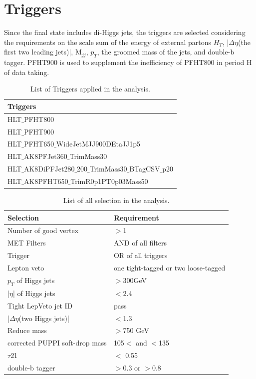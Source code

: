 \section{Triggers} \label{Triggers}
Since the final state includes di-Higgs jets, the triggers are selected considering the requirements on the scale sum of the energy of external partons $H_T$, |$\Delta \eta $(the first two leading jets)|, M$_{jj}$, $p_T$, the groomed mass of the jets, and double-b tagger. PFHT900 is used to supplement the inefficiency of PFHT800 in period H of data taking.
\begin{table}[h!]
  \begin{center}
    \begin{tabular}{l}
    Triggers \\
    \hline
    HLT$\_$PFHT800 \\
    HLT$\_$PFHT900 \\
    HLT$\_$PFHT650$\_$WideJetMJJ900DEtaJJ1p5 \\
    HLT$\_$AK8PFJet360$\_$TrimMass30 \\
    HLT$\_$AK8DiPFJet280$\_$200$\_$TrimMass30$\_$BTagCSV$\_$p20 \\
    HLT$\_$AK8PFHT650$\_$TrimR0p1PT0p03Mass50 \\
    \hline
    \end{tabular}
  \end{center}

  \caption{List of Triggers applied in the analysis.}
\end{table} 

\begin{table}[h!]
  \begin{center}
    \begin{tabular}{ll}
    Selection & Requirement \\
    \hline
    Number of good vertex & $>$1 \\
    MET Filters & AND of all filters\\
	Trigger & OR of all triggers\\
	Lepton veto & one tight-tagged or two loose-tagged \\
    $p_{T}$ of Higgs jets & $>$300GeV \\
	|$\eta$| of Higgs jets & $<$2.4 \\
	Tight LepVeto jet ID & pass \\
	|$\Delta \eta $(two Higgs jets)| & $<$1.3 \\
	Reduce mass & $>$750 GeV \\
	corrected PUPPI soft-drop mass & 105$<$ and $<$135 \\
	$\tau$21 & $<$ 0.55 \\
	double-b tagger & $>$0.3 or $>$0.8 \\
	\hline
    \end{tabular}
  \end{center}

  \caption{List of all selection in the analysis.}
\end{table} 



